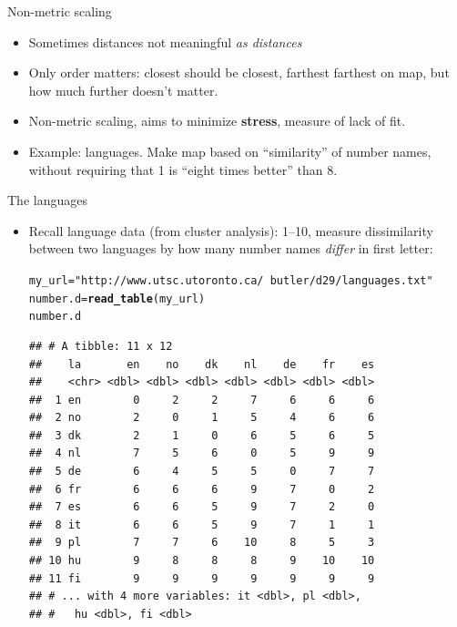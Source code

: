 \documentclass[unknownkeysallowed]{beamer}\usepackage[]{graphicx}\usepackage[]{color}
\makeatletter
\newcommand{\hlstr}[1]{\textcolor[rgb]{0.192,0.494,0.8}{#1}}%
\newcommand{\hlstd}[1]{\textcolor[rgb]{0.345,0.345,0.345}{#1}}%
\newcommand{\hlkwb}[1]{\textcolor[rgb]{0.69,0.353,0.396}{#1}}%
\newcommand{\hlkwd}[1]{\textcolor[rgb]{0.737,0.353,0.396}{\textbf{#1}}}%
\newenvironment{kframe}{%
 \def\at@end@of@kframe{}%
 \ifinner\ifhmode%
  \def\at@end@of@kframe{\end{minipage}}%
  \begin{minipage}{\columnwidth}%
 \fi\fi%
 \def\FrameCommand##1{\hskip\@totalleftmargin \hskip-\fboxsep
 \colorbox{shadecolor}{##1}\hskip-\fboxsep
     \hskip-\linewidth \hskip-\@totalleftmargin \hskip\columnwidth}%
 \MakeFramed {\advance\hsize-\width
   \@totalleftmargin\z@ \linewidth\hsize
   \@setminipage}}%
 {\par\unskip\endMakeFramed%
 \at@end@of@kframe}
\newenvironment{knitrout}{}{} %
\makeatother
\begin{document}
\begin{frame}[fragile]{Non-metric scaling}
  
  \begin{itemize}
  \item Sometimes distances not meaningful \emph{as distances}
  \item Only order matters: closest should be closest, farthest
    farthest on map, but how much further doesn't matter.
  \item Non-metric scaling, aims to minimize \textbf{stress}, measure
    of lack of fit.
  \item Example: languages. Make map based on ``similarity'' of number
    names, without requiring that 1 is ``eight times better'' than 8.
  \end{itemize}
  
\end{frame}

\begin{frame}[fragile]{The languages}

  \begin{itemize}
  \item Recall language data (from cluster analysis): 1--10, measure dissimilarity between two languages by how many number names {\em differ} in first letter:


    
\begin{knitrout}\scriptsize
{}\color{fgcolor}\begin{kframe}
\begin{alltt}
\hlstd{my_url}\hlkwb{=}\hlstr{"http://www.utsc.utoronto.ca/~butler/d29/languages.txt"}
\hlstd{number.d}\hlkwb{=}\hlkwd{read_table}\hlstd{(my_url)}
\hlstd{number.d}
\end{alltt}
\begin{verbatim}
## # A tibble: 11 x 12
##    la       en    no    dk    nl    de    fr    es
##    <chr> <dbl> <dbl> <dbl> <dbl> <dbl> <dbl> <dbl>
##  1 en        0     2     2     7     6     6     6
##  2 no        2     0     1     5     4     6     6
##  3 dk        2     1     0     6     5     6     5
##  4 nl        7     5     6     0     5     9     9
##  5 de        6     4     5     5     0     7     7
##  6 fr        6     6     6     9     7     0     2
##  7 es        6     6     5     9     7     2     0
##  8 it        6     6     5     9     7     1     1
##  9 pl        7     7     6    10     8     5     3
## 10 hu        9     8     8     8     9    10    10
## 11 fi        9     9     9     9     9     9     9
## # ... with 4 more variables: it <dbl>, pl <dbl>,
## #   hu <dbl>, fi <dbl>
\end{verbatim}
\end{kframe}
\end{knitrout}




  \end{itemize}
  
\end{frame}
\end{document}
